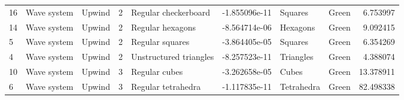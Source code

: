 \begin{tabular}{lllrlrllr}
16 &  Wave system &                Upwind &               2 &            Regular checkerboard & -1.855096e-11 &               Squares &      Green &            6.753997 \\
14 &  Wave system &                Upwind &               2 &                Regular hexagons & -8.564714e-06 &              Hexagons &      Green &            9.092415 \\
5  &  Wave system &                Upwind &               2 &                 Regular squares & -3.864405e-05 &               Squares &      Green &            6.354269 \\
4  &  Wave system &                Upwind &               2 &          Unstructured triangles & -8.257523e-11 &             Triangles &      Green &            4.388074 \\
10 &  Wave system &                Upwind &               3 &                   Regular cubes & -3.262658e-05 &                 Cubes &      Green &           13.378911 \\
6  &  Wave system &                Upwind &               3 &              Regular tetrahedra & -1.117835e-11 &            Tetrahedra &      Green &           82.498338 \\
\bottomrule
\end{tabular}
